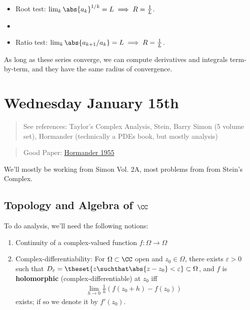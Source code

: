 \begin{itemize}
\tightlist
\item
  Root test: \(\lim_k \abs{a_k}^{1/k} = L \implies R = \frac 1 L\).
\item
\item
  Ratio test: \(\lim_k \abs{a_{k+1} / a_k} = L \implies R = \frac 1 L\).
\end{itemize}

As long as these series converge, we can compute derivatives and
integrals term-by-term, and they have the same radius of convergence.

\hypertarget{wednesday-january-15th}{%
\section{Wednesday January 15th}\label{wednesday-january-15th}}

\begin{quote}
See references: Taylor's Complex Analysis, Stein, Barry Simon (5 volume
set), Hormander (technically a PDEs book, but mostly analysis)
\end{quote}

\begin{quote}
Good Paper:
\href{https://projecteuclid.org/download/pdf_1/euclid.acta/1485892151}{Hormander
1955}
\end{quote}

We'll mostly be working from Simon Vol. 2A, most problems from from
Stein's Complex.

\hypertarget{topology-and-algebra-of-cc}{%
\subsection{\texorpdfstring{Topology and Algebra of
\(\CC\)}{Topology and Algebra of \textbackslash CC}}\label{topology-and-algebra-of-cc}}

To do analysis, we'll need the following notions:

\begin{enumerate}
\def\labelenumi{\arabic{enumi}.}
\item
  Continuity of a complex-valued function \(f: \Omega \to \Omega\)
\item
  Complex-differentiability: For \(\Omega \subset \CC\) open and
  \(z_0 \in \Omega\), there exists \(\varepsilon > 0\) such that
  \(D_\varepsilon = \theset{z \suchthat \abs{z - z_0} < \varepsilon} \subset \Omega\),
  and \(f\) is \textbf{holomorphic} (complex-differentiable) at \(z_0\)
  iff
  \begin{align*}\lim_{h\to 0} \frac 1 h (f(z_0 + h) - f(z_0))\end{align*}
  exists; if so we denote it by \(f'(z_0)\).
\end{enumerate}

